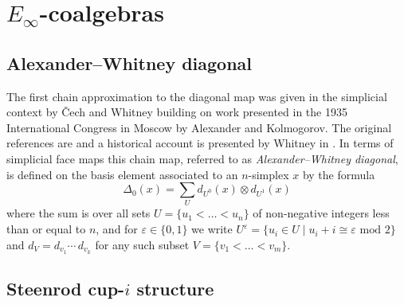 
\section{$E_\infty$-coalgebras} \label{s:integrally}


\subsection{Alexander--Whitney diagonal} \label{ss:aw diagonal}

The first chain approximation to the diagonal map was given in the simplicial context by \v{C}ech and Whitney building on work presented in the 1935 International Congress in Moscow by Alexander and Kolmogorov.
The original references are \cite{alexander1936ring, cech1936multiplication, whitney1938products} and a historical account is presented by Whitney in \cite[p.110]{whitney1988history}.
In terms of simplicial face maps this chain map, referred to as \textit{Alexander--Whitney diagonal}, is defined on the basis element associated to an $n$-simplex $x$ by the formula
\begin{equation} \label{e:aw diagonal}
\Delta_0(x) = \sum_U d_{U^0}(x) \otimes d_{U^1}(x)
\end{equation}
where the sum is over all sets $U = \{u_1 < \dots < u_n\}$ of non-negative integers less than or equal to $n$, and for $\varepsilon \in \{0,1\}$ we write $U^\varepsilon = \{u_i \in U \mid u_i + i\cong \varepsilon \text{ mod } 2\}$ and $d_V = d_{v_1}\! \dotsm \, d_{v_k}$ for any such subset $V = \{v_1 < \dots < v_m\}$.

\subsection{Steenrod cup-$i$ structure} \label{ss:cup-i}

